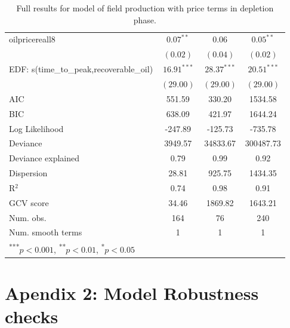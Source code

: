 \documentclass[12pt]{article}
\begin{document}
\begin{table}
\begin{center}
\begin{tabular}{l c c c }
oilpricereall8                    & $0.07^{**}$   & $0.06$        & $0.05^{**}$   \\
                                     & $(0.02)$      & $(0.04)$      & $(0.02)$      \\
EDF: s(time_to_peak,recoverable_oil) & $16.91^{***}$ & $28.37^{***}$ & $20.51^{***}$ \\
                                     & $(29.00)$     & $(29.00)$     & $(29.00)$     \\
\hline
AIC                                  & 551.59        & 330.20        & 1534.58       \\
BIC                                  & 638.09        & 421.97        & 1644.24       \\
Log Likelihood                       & -247.89       & -125.73       & -735.78       \\
Deviance                             & 3949.57       & 34833.67      & 300487.73     \\
Deviance explained                   & 0.79          & 0.99          & 0.92          \\
Dispersion                           & 28.81         & 925.75        & 1434.35       \\
R$^2$                                & 0.74          & 0.98          & 0.91          \\
GCV score                            & 34.46         & 1869.82       & 1643.21       \\
Num. obs.                            & 164           & 76            & 240           \\
Num. smooth terms                    & 1             & 1             & 1             \\
\hline
\multicolumn{4}{l}{\scriptsize{\textsuperscript{***}$p<0.001$, 
  \textsuperscript{**}$p<0.01$, 
  \textsuperscript{*}$p<0.05$}}
\end{tabular}
\caption{Full results for model of field production with price terms in depletion phase.}
\label{table:prepeak}
\end{center}
\end{table}



 \section{Apendix 2: Model Robustness checks}
\end{document}
